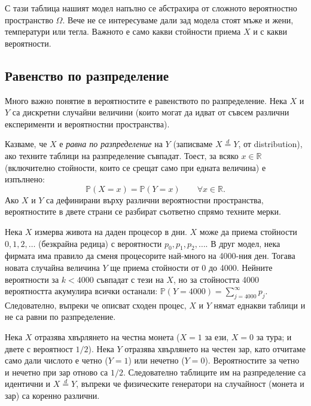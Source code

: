 С тази таблица нашият модел напълно се абстрахира от сложното вероятностно пространство $\Omega$. Вече не се интересуваме дали зад модела стоят мъже и жени, температури или тегла. Важното е само какви стойности приема $X$ и с какви вероятности.

\subsection{Равенство по разпределение}
Много важно понятие в вероятностите е равенството по разпределение. Нека $X$ и $Y$ са дискретни случайни величини (които могат да идват от съвсем различни експерименти и вероятностни пространства).

\begin{defn}
Казваме, че $X$ е \emph{равна по разпределение} на $Y$ (записваме $X \stackrel{d}{=} Y$, от distribution), ако техните таблици на разпределение съвпадат. Тоест, за всяко $x\in\mathbb{R}$ (включително стойности, които се срещат само при едната величина) е изпълнено:
\[ \mathbb{P}(X = x) = \mathbb{P}(Y = x) \qquad \forall x\in\mathbb{R}. \]
Ако $X$ и $Y$ са дефинирани върху различни вероятностни пространства, вероятностите в двете страни се разбират съответно спрямо техните мерки.
\end{defn}

\begin{example}\label{ex:04-1}
Нека $X$ измерва живота на даден процесор в дни. $X$ може да приема стойности $0, 1, 2, \dots$ (безкрайна редица) с вероятности $p_0, p_1, p_2, \dots$.
В друг модел, нека фирмата има правило да сменя процесорите най-много на 4000-ния ден. Тогава новата случайна величина $Y$ ще приема стойности от 0 до 4000. Нейните вероятности за $k < 4000$ съвпадат с тези на $X$, но за стойността 4000 вероятността акумулира всички останали: $\mathbb{P}(Y=4000) = \sum_{j=4000}^{\infty} p_j$. Следователно, въпреки че описват сходен процес, $X$ и $Y$ нямат еднакви таблици и не са равни по разпределение.

\end{example}

\begin{example}\label{ex:04-2}
Нека $X$ отразява хвърлянето на честна монета ($X=1$ за ези, $X=0$ за тура; и двете с вероятност $1/2$). Нека $Y$ отразява хвърлянето на честен зар, като отчитаме само дали числото е четно ($Y=1$) или нечетно ($Y=0$). Вероятностите за четно и нечетно при зар отново са $1/2$. Следователно таблиците им на разпределение са идентични и $X \stackrel{d}{=} Y$, въпреки че физическите генератори на случайност (монета и зар) са коренно различни.

\end{example}


